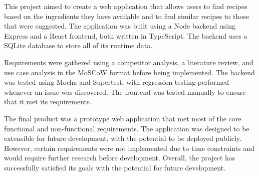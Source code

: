
This project aimed to create a web application that allows users to find recipes based on the ingredients they have available
and to find similar recipes to those that were suggested. The application was built using a Node backend using Express and
a React frontend, both written in TypeScript. The backend uses a SQLite database to store all of its runtime data.

Requirements were gathered using a competitor analysis, a literature review, and use case analysis in the MoSCoW format before
being implemented. The backend was tested using Mocha and Supertest, with regression testing performed whenever an issue was
discovered. The frontend was tested manually to ensure that it met its requirements.

The final product was a prototype web application that met most of the core functional and non-functional requirements. The
application was designed to be extensible for future development, with the potential to be deployed publicly. However, certain
requirements were not implemented due to time constraints and would require further research before development. Overall, the
project has successfully satisfied its goals with the potential for future development.
